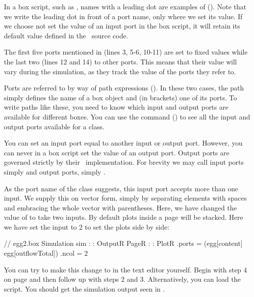 \bigskip
In a box script, such as , names with a leading dot are examples of  (). Note that we write the leading dot in front of a port name, only where we set its value. If we choose not set the value of an input port in the box script, it will retain its default value defined in the \CPP\ source code.

The first five ports mentioned in  (lines 3, 5-6, 10-11) are set to fixed values while the last two (lines 12 and 14)  to other ports. This means that their value will vary during the simulation, as they track the value of the ports they refer to. 

Ports are referred to by way of path expressions (). In these two cases, the path simply defines the name of a box object and (in brackets) one of its ports. To write paths like these, you need to know which input and output ports are available for different boxes. You can use the  command () to see all the input and output ports available for a class.

You can set an input port equal to another input or output port. However, you can never in a box script set the value of an output port. Output ports are governed strictly by their \CPP\ implementation. For brevity we may call input ports simply  and output ports, simply .

As the port name  of the  class suggests, this input port accepts more than one input. We supply this on vector form, simply by separating elements with spaces and embracing the whole vector with parentheses. Here, we have changed the value of  to take two inputs. By default plots inside a page will be stacked. Here we have set the  input to 2 to set the plots side by side:

\lstset{numbers=left}
\begin{boxscript}
// egg2.box
Simulation sim {
:
:
  OutputR {
    PageR {
:
:
      PlotR {
        .ports = (egg[content] egg[outflowTotal])
        .ncol = 2
      }
    }
  }
}
\end{boxscript}
\lstset{numbers=none}

You can try to make this change to  in the text editor yourself. Begin with step 4 on page \pageref{NielsH} and then follow up with steps 2 and 3. Alternatively, you can load the  script. You should get the simulation output seen in .
 
